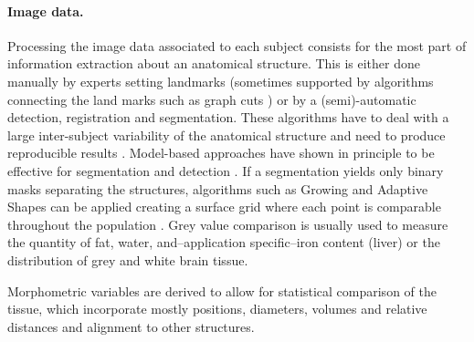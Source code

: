 \documentclass[journal]{style/vgtc} 			          %
\begin{document}
\paragraph{Image data. }
Processing the image data associated to each subject consists for the most part of information extraction about an anatomical structure.
%
This is either done manually by experts setting landmarks (sometimes supported by algorithms connecting the land marks such as graph cuts \cite{GraphCut}) or by a (semi)-automatic detection, registration and segmentation.
%
These algorithms have to deal with a large inter-subject variability of the anatomical structure and need to produce reproducible results \cite{Preim2014}.
%
Model-based approaches have shown in principle to be effective for segmentation \cite{Gloger2010, Gloger2012} and detection \cite{Rak2013}.
%
If a segmentation yields only binary masks separating the structures, algorithms such as Growing and Adaptive Shapes can be applied creating a surface grid where each point is comparable throughout the population \cite{Ferrarini2007}.
%
%
Grey value comparison is usually used to measure the quantity of fat, water, and--application specific--iron content (liver) or the distribution of grey and white brain tissue.

Morphometric variables are derived to allow for statistical comparison of the tissue, which incorporate mostly positions, diameters, volumes and relative distances and alignment to other structures.
% 
\end{document}
